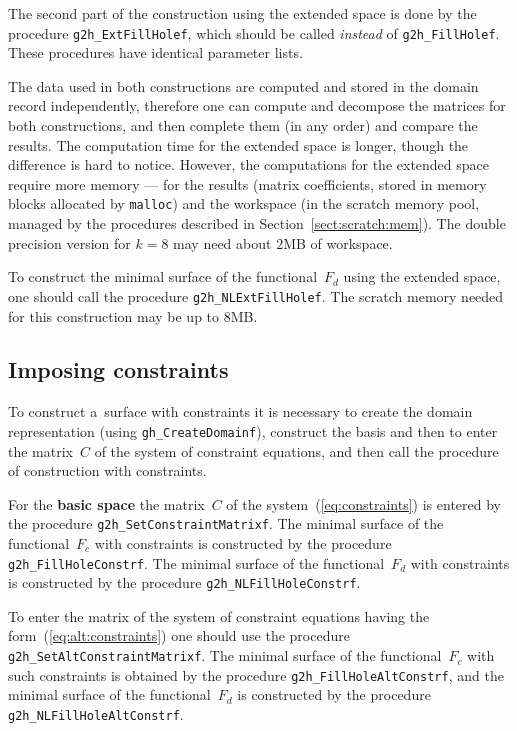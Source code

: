 The second part of the construction using the extended space is done
by the procedure \texttt{g2h\_ExtFillHolef}, which should be called
\emph{instead} of \texttt{g2h\_FillHolef}. These procedures
have identical parameter lists.

The data used in both constructions are computed and stored in the
domain record independently, therefore one can compute and decompose the
matrices for both constructions, and then complete them
(in any order) and compare the results. The computation time for the
extended space is longer, though the difference is hard to notice.
However, the computations for the extended space require more memory ---
for the results (matrix coefficients, stored in memory blocks allocated by
\texttt{malloc}) and the workspace (in the scratch memory pool, managed
by the procedures described in Section~\ref{sect:scratch:mem}).
The double precision version for $k=8$ may need about $2$MB of workspace.

To construct the minimal surface of the functional~$F_d$ using the extended
space, one should call the procedure \texttt{g2h\_NLExtFillHolef}. The scratch
memory needed for this construction may be up to $8$MB.


\subsection{\label{ssect:g2h:constraints}Imposing constraints}

To construct a~surface with constraints it is necessary to create the domain
representation (using \texttt{gh\_CreateDomainf}), construct the basis and
then to enter the matrix~$C$ of the system of constraint equations, and then
call the procedure of construction with constraints.

\begin{sloppypar}
For the \textbf{basic space} the matrix~$C$ of the system~(\ref{eq:constraints})
is entered by the procedure \texttt{g2h\_SetConstraintMatrixf}. The minimal surface
of the functional~$F_c$ with constraints is constructed by the procedure
\texttt{g2h\_FillHoleConstrf}. The minimal surface of the functional~$F_d$
with constraints is constructed by the procedure \texttt{g2h\_NLFillHoleConstrf}.%
\end{sloppypar}

\begin{sloppypar}
To enter the matrix of the system of constraint equations having the
form~(\ref{eq:alt:constraints}) one should use the procedure
\texttt{g2h\_SetAltConstraintMatrixf}. The minimal surface of the functional~$F_c$
with such constraints is obtained by the procedure
\texttt{g2h\_FillHoleAltConstrf}, and the minimal surface of the
functional~$F_d$ is constructed by the procedure
\texttt{g2h\_NLFillHoleAltConstrf}.%
\end{sloppypar}

